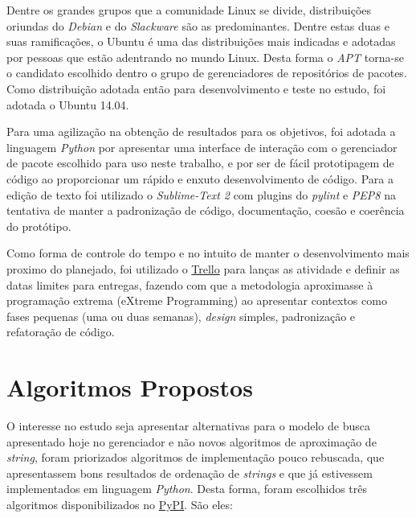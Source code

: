 Dentre os grandes grupos que a comunidade Linux se divide, distribuições oriundas do \textit{Debian} e do \textit{Slackware} são as predominantes. Dentre estas duas e suas ramificações, o Ubuntu é uma das distribuições mais indicadas e adotadas por pessoas que estão adentrando no mundo Linux. Desta forma o \textit{APT} torna-se o candidato escolhido dentro o grupo de gerenciadores de repositórios de pacotes. Como distribuição adotada então para desenvolvimento e teste no estudo, foi adotada o Ubuntu 14.04. 

Para uma agilização na obtenção de resultados para os objetivos, foi adotada a linguagem \textit{Python} por apresentar uma interface de interação com o gerenciador de pacote escolhido para uso neste trabalho,  e por ser de fácil prototipagem de código ao proporcionar um rápido e enxuto desenvolvimento de código. Para a edição de texto foi utilizado o \textit{Sublime-Text 2} com plugins do \textit{pylint} e \textit{PEP8} na tentativa de manter a padronização de código, documentação, coesão e coerência do protótipo.

Como forma de controle do tempo e no intuito de manter o desenvolvimento mais proximo do planejado, foi utilizado o \href{https://trello.com}{Trello} para lanças as atividade e definir as datas limites para entregas, fazendo com que a metodologia aproximasse à programação extrema (eXtreme Programming) ao apresentar contextos como fases pequenas (uma ou duas semanas), \textit{design} simples, padronização e refatoração de código.





\section{Algoritmos Propostos} %
\label{sec:algoritmos_propostos}

O interesse no estudo seja apresentar alternativas para o modelo de busca apresentado hoje no gerenciador e não novos algoritmos de aproximação de \textit{string}, foram priorizados algoritmos de implementação pouco rebuscada, que apresentassem bons resultados de ordenação de \textit{strings} e que já estivessem implementados em linguagem \textit{Python}. Desta forma, foram escolhidos três algoritmos disponibilizados no \href{https://pypi.python.org/}{PyPI}. São eles:

